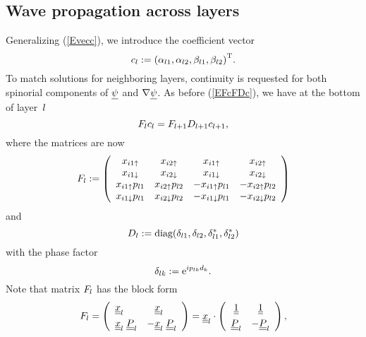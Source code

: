\subsection{Wave propagation across layers}

Generalizing (\ref{Evecc}),
we introduce the coefficient vector
\begin{equation}
  c_l := {(\alpha_{l1}, \alpha_{l2}, \beta_{l1}, \beta_{l2})}^\text{T}.
\end{equation}
To match solutions for neighboring layers,
continuity is requested for both spinorial components
of $\underline{\psi}$ and $\mathbf{\nabla}\underline{\psi}$.
As before (\ref{EFcFDc}), we have at the bottom of layer~$l$
\begin{equation}\label{EFcFDcp}
  F_l c_l = F_{l+1} D_{l+1} c_{l+1},
\end{equation}
where the matrices are now
\begin{equation}
  F_l := \left(\begin{array}{cccc}
    x_{i1\uparrow}      &x_{i2\uparrow}     &x_{i1\uparrow}       &x_{i2\uparrow}       \\
    x_{i1\downarrow}      &x_{i2\downarrow}     &x_{i1\downarrow}       &x_{i2\downarrow}       \\
    x_{i1\uparrow}p_{l1}&x_{i2\uparrow}p_{l2}&-x_{i1\uparrow}p_{l1}&-x_{i2\uparrow}p_{l2}\\
    x_{i1\downarrow}p_{l1}&x_{i2\downarrow}p_{l2}&-x_{i1\downarrow}p_{l1}&-x_{i2\downarrow}p_{l2}
  \end{array}\right)
\end{equation}
and
\begin{equation}
  D_l := \text{diag}(\delta_{l1}, \delta_{l2}, \delta_{l1}^*, \delta_{l2}^*)
\end{equation}
with the phase factor
\begin{equation}
   \delta_{l k} := \text{e}^{ip_{l k}d_k}.
\end{equation}
Note that matrix $F_l$ has the block form
\begin{equation}
  F_l
  =\left(\begin{array}{ll}\underline{\underline{x}}_l&\hphantom{-}\underline{\underline{x}}_l\\[1ex]
    \underline{\underline{x}}_l\; \underline{\underline{P}}_l&-\underline{\underline{x}}_l\; \underline{\underline{P}}_l\end{array}\right)
    = \underline{\underline{x}}_l \cdot
    \left(\begin{array}{cc}\underline{\underline{1}}&\underline{\underline{1}}\\[1ex]
    \underline{\underline{P}}_l&-\underline{\underline{P}}_l\end{array}\right),
\end{equation}
